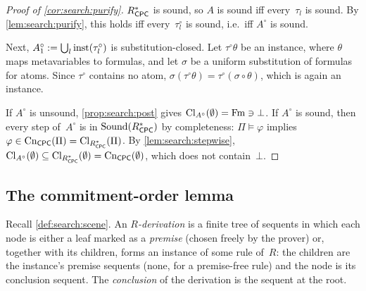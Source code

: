 \begin{proof}[Proof of \cref{cor:search:purify}]
$R^{*}_{\mathsf{CPC}}$ is sound, so $A$ is sound iff every~$\tau_l$ is sound. By \cref{lem:search:purify}, this holds iff every~$\tau_l^\circ$ is sound, i.e.\ iff $A^\circ$ is sound.

Next, $A_1^\circ:=\bigcup_l\mathrm{inst}(\tau_l^\circ)$ is substitution-closed. Let $\tau^\circ\theta$ be an instance, where $\theta$ maps metavariables to formulas, and let $\sigma$ be a uniform substitution of formulas for atoms. Since $\tau^\circ$ contains no atom, $\sigma(\tau^\circ\theta)=\tau^\circ(\sigma\circ\theta)$, which is again an instance.

If $A^\circ$ is unsound, \cref{prop:search:post} gives $\mathrm{Cl}_{A^\circ}(\emptyset)=\mathrm{Fm}\ni\bot$. If $A^\circ$ is sound, then every step of~$A^\circ$ is in $\mathrm{Sound}(R^{*}_{\mathsf{CPC}})$ by completeness: $\Pi\models\varphi$ implies $\varphi\in\mathrm{Cn}_{\mathsf{CPC}}(\Pi)=\mathrm{Cl}_{R^{*}_{\mathsf{CPC}}}(\Pi)$. By \cref{lem:search:stepwise}, $\mathrm{Cl}_{A^\circ}(\emptyset)\subseteq\mathrm{Cl}_{R^{*}_{\mathsf{CPC}}}(\emptyset)=\mathrm{Cn}_{\mathsf{CPC}}(\emptyset)$, which does not contain~$\bot$.
\end{proof}

\subsection{The commitment-order lemma}\label{app:search:commitment}

Recall \cref{def:search:scene}. An \emph{$R$-derivation} is a finite tree of sequents in which each node is either a leaf marked as a \emph{premise} (chosen freely by the prover) or, together with its children, forms an instance of some rule of~$R$: the children are the instance's premise sequents (none, for a premise-free rule) and the node is its conclusion sequent. The \emph{conclusion} of the derivation is the sequent at the root.

